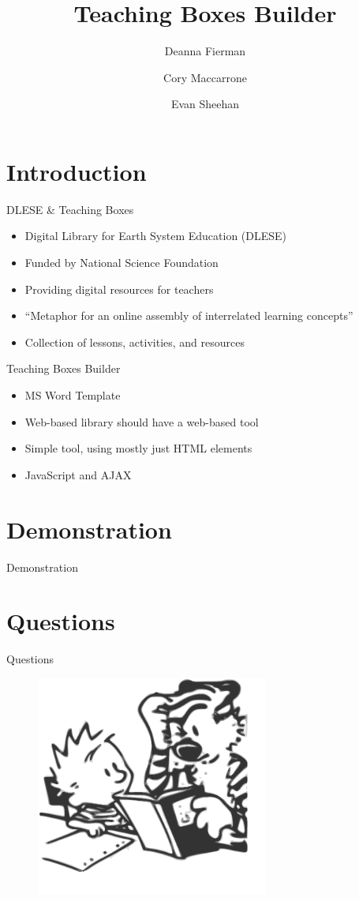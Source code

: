 \documentclass[style=horatio,mode=present,paper=screen]{powerdot}
\title{Teaching Boxes Builder}
\author{
	Deanna Fierman
	\and
	Cory Maccarrone
	\and
	Evan Sheehan
}
\begin{document}
\maketitle

\section[slide=false]{Introduction}
\begin{slide}{DLESE \& Teaching Boxes}
\begin{itemize}
\item Digital Library for Earth System Education (DLESE)
\item Funded by National Science Foundation
\item Providing digital resources for teachers
\item ``Metaphor for an online assembly of interrelated learning concepts''
\item Collection of lessons, activities, and resources
\end{itemize}
\end{slide}

\begin{slide}{Teaching Boxes Builder}
\begin{itemize}
\item MS Word Template
\item Web-based library should have a web-based tool
\item Simple tool, using mostly just HTML elements
\item JavaScript and AJAX
\end{itemize}
\end{slide}

\section[slide=false]{Demonstration}
\begin{slide}[toc=,bm=]{Demonstration}
\end{slide}

\section[slide=false]{Questions}
\begin{slide}[toc=,bm=]{Questions}
\begin{figure}
\includegraphics[width=3in]{figures/calvin_and_hobbes}
\end{figure}
\end{slide}
\end{document}
